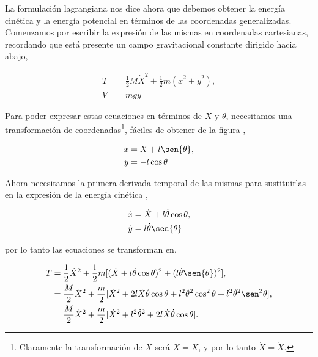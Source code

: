 \documentclass[a4paper,10pt]{article}
\numberwithin{equation}{section}
\begin{document}
\vspace{.3cm}

La formulación lagrangiana nos dice ahora que debemos obtener la energía cinética y la 
energía potencial en términos de las coordenadas generalizadas. Comenzamos por escribir 
la expresión de las mismas en coordenadas cartesianas, recordando que está presente un 
campo gravitacional constante dirigido hacia abajo,

\begin{align}
\label{eq:pendu5}
 T &= \frac{1}{2} M \dot{X}^2 + \frac{1}{2}m(\dot{x}^2+\dot{y}^2), \\
\label{eq:pendu6}
 V &= mgy
 \end{align}

Para poder expresar estas ecuaciones en términos de $X$ y $\theta$, necesitamos una 
transformación de coordenadas\footnote{Claramente la transformación de $X$ será $X = X$, 
y por lo tanto $\dot{X} = \dot{X}$.}, fáciles de obtener de la figura 
,

\begin{align}
 x &= X + l \sen{\theta}, \\
 y &= -l \cos{\theta}
\end{align}

Ahora necesitamos la primera derivada temporal de las mismas para sustituirlas en 
la expresión de la energía cinética ,

\begin{align}
 \dot{x} &= \dot{X} + l \dot{\theta} \cos{\theta}, \\
 \dot{y} &= l \dot{\theta} \sen{\theta}
\end{align}

por lo tanto las ecuaciones  se transforman en,

\begin{align}
 \begin{split}
  T &= \frac{1}{2} \dot{X}^2 + \frac{1}{2}m[(\dot{X}+ l \dot{\theta} \cos{\theta})^2 +
    (l \dot{\theta} \sen{\theta})^2], \\
    &= \frac{M}{2}\dot{X}^2 + \frac{m}{2}[\dot{X}^2 + 2l\dot{X}\dot{\theta}\cos{\theta} + 
    l^2 \dot{\theta}^2 \cos^2{\theta} + l^2 \dot{\theta}^2 \sen^2{\theta}], \\
    &= \frac{M}{2}\dot{X}^2 + \frac{m}{2}[\dot{X}^2 + l^2 \dot{\theta}^2 + 
    2l\dot{X}\dot{\theta}\cos{\theta}].
 \end{split}
\end{align}
\end{document}
